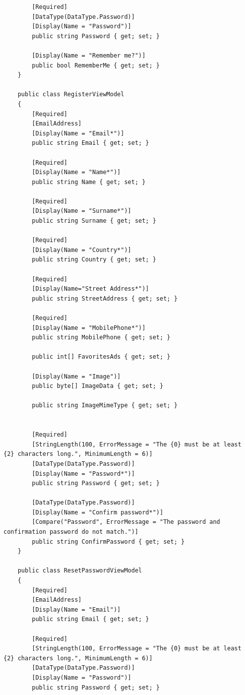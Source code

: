 \documentclass[14pt,a4paper]{extreport}
\begin{document}
\begin{lstlisting}
        [Required]
        [DataType(DataType.Password)]
        [Display(Name = "Password")]
        public string Password { get; set; }

        [Display(Name = "Remember me?")]
        public bool RememberMe { get; set; }
    }

    public class RegisterViewModel
    {
        [Required]
        [EmailAddress]
        [Display(Name = "Email*")]
        public string Email { get; set; }
        
        [Required]
        [Display(Name = "Name*")]
        public string Name { get; set; }
        
        [Required]
        [Display(Name = "Surname*")]
        public string Surname { get; set; }

        [Required]
        [Display(Name = "Country*")]
        public string Country { get; set; }

        [Required]
        [Display(Name="Street Address*")]
        public string StreetAddress { get; set; }

        [Required]
        [Display(Name = "MobilePhone*")]
        public string MobilePhone { get; set; }

        public int[] FavoritesAds { get; set; }

        [Display(Name = "Image")]
        public byte[] ImageData { get; set; }

        public string ImageMimeType { get; set; }


        [Required]
        [StringLength(100, ErrorMessage = "The {0} must be at least {2} characters long.", MinimumLength = 6)]
        [DataType(DataType.Password)]
        [Display(Name = "Password*")]
        public string Password { get; set; }

        [DataType(DataType.Password)]
        [Display(Name = "Confirm password*")]
        [Compare("Password", ErrorMessage = "The password and confirmation password do not match.")]
        public string ConfirmPassword { get; set; }
    }

    public class ResetPasswordViewModel
    {
        [Required]
        [EmailAddress]
        [Display(Name = "Email")]
        public string Email { get; set; }

        [Required]
        [StringLength(100, ErrorMessage = "The {0} must be at least {2} characters long.", MinimumLength = 6)]
        [DataType(DataType.Password)]
        [Display(Name = "Password")]
        public string Password { get; set; }


\end{lstlisting}
\end{document}
